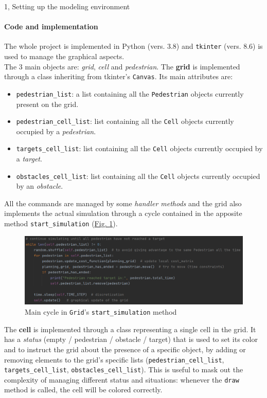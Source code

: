 \documentclass[10pt,a4paper]{article}
\begin{document}
\begin{task}{1, Setting up the modeling environment}
\paragraph{Code and implementation}
The whole project is implemented in Python (vers. 3.8) and \texttt{tkinter} \cite{tkinter} (vers. 8.6) is used to manage the graphical aspects.\\
The 3 main objects are: \textit{grid}, \textit{cell} and \textit{pedestrian}.
The \textbf{grid} is implemented through a class inheriting from tkinter's \texttt{Canvas}.
Its main attributes are:
\begin{itemize}
    \item \texttt{pedestrian\_list}: a list containing all the \texttt{Pedestrian} objects currently present on the grid.
    \item \texttt{pedestrian\_cell\_list}: list containing all the \texttt{Cell} objects currently occupied by a \textit{pedestrian}.
    \item \texttt{targets\_cell\_list}: list containing all the \texttt{Cell} objects currently occupied by a \textit{target}.
    \item \texttt{obstacles\_cell\_list}: list containing all the \texttt{Cell} objects currently occupied by an \textit{obstacle}.
\end{itemize}
All the commands are managed by some \textit{handler methods} and the grid also implements the actual simulation through a cycle contained in the apposite method \texttt{start\_simulation} (\hyperref[fig:simulation-cycle]{Fig. \ref{fig:simulation-cycle}}).
\begin{figure}[H]
    \centering
    \includegraphics[scale=0.7]{simulation_cycle.png}
    \caption{Main cycle in \texttt{Grid}'s \texttt{start\_simulation} method}
    \label{fig:simulation-cycle}
\end{figure}

The \textbf{cell} is implemented through a class representing a single cell in the grid.
It has a \textit{status} (empty / pedestrian / obstacle / target) that is used to set its color and to instruct the grid about the presence of a specific object, by adding or removing elements to the grid's specific lists (\texttt{pedestrian\_cell\_list}, \texttt{targets\_cell\_list}, \texttt{obstacles\_cell\_list}).
This is useful to mask out the complexity of managing different status and situations: whenever the \texttt{draw} method is called, the cell will be colored correctly.


\end{task}
\end{document}
